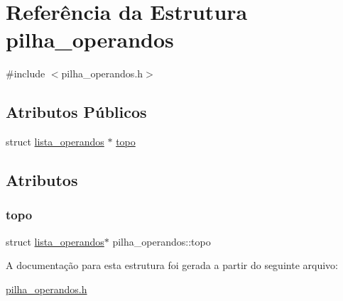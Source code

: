 \hypertarget{structpilha__operandos}{}\section{Referência da Estrutura pilha\+\_\+operandos}
\label{structpilha__operandos}


{\ttfamily \#include $<$pilha\+\_\+operandos.\+h$>$}

\subsection*{Atributos Públicos}
\begin{DoxyCompactItemize}
\item 
struct \hyperlink{structlista__operandos}{lista\+\_\+operandos} $\ast$ \hyperlink{structpilha__operandos_a993dd7722eed1663f266c36ecf0b8417}{topo}
\end{DoxyCompactItemize}


\subsection{Atributos}
\mbox{\label{structpilha__operandos_a993dd7722eed1663f266c36ecf0b8417}} 
\subsubsection{\texorpdfstring{topo}{topo}}
{\footnotesize\ttfamily struct \hyperlink{structlista__operandos}{lista\+\_\+operandos}$\ast$ pilha\+\_\+operandos\+::topo}



A documentação para esta estrutura foi gerada a partir do seguinte arquivo\+:\begin{DoxyCompactItemize}
\item 
\hyperlink{pilha__operandos_8h}{pilha\+\_\+operandos.\+h}\end{DoxyCompactItemize}
